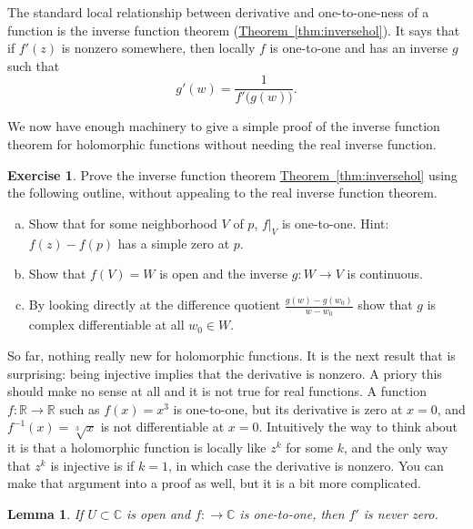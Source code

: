 \documentclass[12pt,openany]{book}
\newcommand{\C}{{\mathbb{C}}}
\newcommand{\R}{{\mathbb{R}}}
\theoremstyle{plain}
\newtheorem{lemma}[thm]{Lemma}
\theoremstyle{remark}
\theoremstyle{definition}
\newenvironment{exbox}{%
    \def\FrameCommand{\vrule width 1pt \relax\hspace{10pt}}%
    \MakeFramed{\advance\hsize-\width\FrameRestore}%
}{%
    \endMakeFramed
}
\newenvironment{exparts}{%
    \leavevmode\begin{enumerate}[a),noitemsep,topsep=0pt,parsep=0pt,partopsep=0pt]
}{%
    \end{enumerate}
}
\theoremstyle{exercise}
\newtheorem{exercise}{Exercise}[section]
\theoremstyle{example}
\newcommand{\thmref}[1]{\hyperref[#1]{Theorem~\ref*{#1}}}
\begin{document}
The standard local relationship between derivative and one-to-one-ness of a
function is the inverse function theorem (\thmref{thm:inversehol}).
It says that if $f'(z)$ is nonzero somewhere, then locally $f$ is
one-to-one and has an inverse $g$ such that
\begin{equation*}
g'(w) = \frac{1}{f'\bigl(g(w)\bigr)} .
\end{equation*}

We now have enough machinery to give a simple proof
of the inverse function theorem for holomorphic functions
without needing the real inverse function.

\begin{exbox}
\begin{exercise}
Prove the inverse function theorem \thmref{thm:inversehol}
using the following outline, without appealing to the real inverse function
theorem.
\begin{exparts}
\item Show that for some neighborhood $V$ of $p$, $f|_V$ is one-to-one.
Hint: $f(z)-f(p)$ has a simple zero at $p$.
\item Show that $f(V) = W$ is open and the inverse $g \colon W \to V$ is
continuous.
\item By looking directly at the difference quotient $\frac{g(w)-g(w_0)}{w-w_0}$
show that $g$ is complex differentiable at all $w_0 \in W$.
\end{exparts}
\end{exercise}
\end{exbox}

So far, nothing really new for holomorphic functions.
It is the next
result that is surprising: being injective
implies that the derivative is nonzero.
A priory this should make no sense at all and it is not true for real functions.
A function $f \colon \R \to \R$ such as $f(x) = x^3$
is one-to-one, but its derivative is zero at $x=0$, and $f^{-1}(x) =
\sqrt[3]{x}$ is not differentiable at $x=0$.
Intuitively the way to think about it is that a holomorphic function is
locally like $z^k$ for some $k$, and the only way that $z^k$ is injective is
if $k=1$, in which case the derivative is nonzero.  You can make that
argument into a proof as well, but it is a bit more complicated.

\begin{lemma} \label{lemma:dernonzero}
If $U \subset \C$ is open and $f \colon \to \C$ is one-to-one, then
$f'$ is never zero.
\end{lemma}
\end{document}
